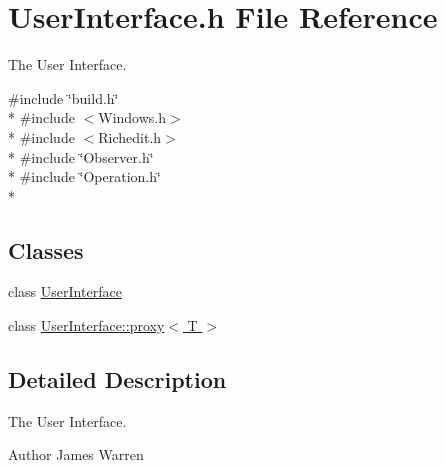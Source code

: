 \section{User\-Interface.\-h File Reference}
\label{_user_interface_8h}


The User Interface.  


{\ttfamily \#include \char`\"{}build.\-h\char`\"{}}\\*
{\ttfamily \#include $<$Windows.\-h$>$}\\*
{\ttfamily \#include $<$Richedit.\-h$>$}\\*
{\ttfamily \#include \char`\"{}Observer.\-h\char`\"{}}\\*
{\ttfamily \#include \char`\"{}Operation.\-h\char`\"{}}\\*
\subsection*{Classes}
\begin{DoxyCompactItemize}
\item 
class \hyperlink{class_user_interface}{User\-Interface}
\item 
class \hyperlink{class_user_interface_1_1proxy}{User\-Interface\-::proxy$<$ T $>$}
\end{DoxyCompactItemize}


\subsection{Detailed Description}
The User Interface. \begin{DoxyAuthor}{Author}
James Warren 
\end{DoxyAuthor}
